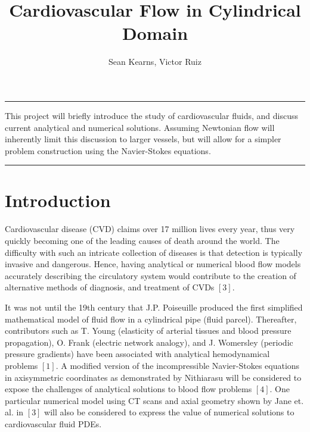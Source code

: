 \documentclass[12pt, a4paper]{article}
\theoremstyle{plain}
\theoremstyle{definition}
\theoremstyle{remark}
\renewenvironment{abstract}{%
\hfill\begin{minipage}{0.95\textwidth}
\rule{\textwidth}{1pt}}
{\par\noindent\rule{\textwidth}{1pt}\end{minipage}}
\begin{document}
%
\title{Cardiovascular Flow in Cylindrical Domain}
\author{Sean Kearns, Victor Ruiz}
%
\maketitle
%
\begin{abstract}
This project will briefly introduce the study of cardiovascular fluids, and discuss current analytical and numerical solutions. Assuming Newtonian flow will inherently limit this discussion to larger vessels, but will allow for a simpler problem construction using the Navier-Stokes equations. %
\end{abstract}
\section{Introduction}
Cardiovascular disease (CVD) claims over 17 million lives every year, thus very quickly becoming one of the leading causes of death around the world. The difficulty with such an intricate collection of diseases is that detection is typically invasive and dangerous. Hence, having analytical or numerical blood flow models accurately describing the circulatory system would contribute to the creation of alternative methods of diagnosis, and treatment of CVDs $[3]$.





It was not until the 19th century that J.P. Poiseuille produced the first simplified mathematical model of fluid flow in a cylindrical pipe (fluid parcel). Thereafter, contributors such as T. Young (elasticity of arterial tissues and blood pressure propagation), O. Frank (electric network analogy), and J. Womersley (periodic pressure gradients) have been associated with analytical hemodynamical problems $[1]$. A modified version of the incompressible Navier-Stokes equations in axisymmetric coordinates as demonstrated by Nithiarasu will be considered to expose the challenges of analytical solutions to blood flow problems $[4]$. One particular numerical model using CT scans and axial geometry shown by Jane et. al. in $[3]$ will also be considered to express the value of numerical solutions to cardiovascular fluid PDEs.
\end{document}
